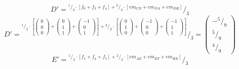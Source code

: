 \documentclass{article}
\newcommand*\rfrac[2]{{}^{#1}\!/_{#2}}%
\begin{document}
\[D'=\rfrac{\rfrac{1}{3}\cdot\left[f_0+f_3+f_4\right]+
\rfrac{2}{3}\cdot\left[em_{CD}+em_{DA}+em_{DH}\right]
}{3}\]
\[D'=\rfrac{\rfrac{1}{3}\cdot\left[
\left({\begin{array}{c} 0 \\  0 \\ 0 \end{array}}\right)+
\left({\begin{array}{c} 0 \\  1 \\ 1 \end{array}}\right)+
\left({\begin{array}{c} -1 \\  0 \\ 1 \end{array}}\right)\right]+
\rfrac{2}{3}\cdot\left[
\left({\begin{array}{c} 0 \\  1 \\ 0 \end{array}}\right)+
\left({\begin{array}{c} -1 \\  0 \\ 0 \end{array}}\right)+
\left({\begin{array}{c} -1 \\  1 \\ 1 \end{array}}\right)\right]
}{3}=\left({\begin{array}{c} -\rfrac{5}{9} \\  \rfrac{5}{9} \\ \rfrac{4}{9} \end{array}}\right)\]
\[E'=\rfrac{\rfrac{1}{3}\cdot\left[f_1+f_4+f_5\right]+
\rfrac{2}{3}\cdot\left[em_{AE}+em_{EF}+em_{HE}\right]
}{3}\]
\end{document}

